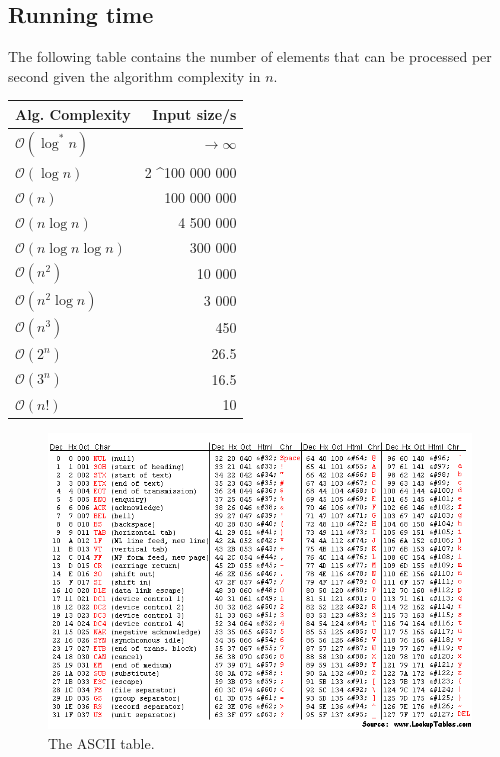 \documentclass[8pt,a4paper,landscape,oneside]{amsart}
\newcommand{\bigO}{\mathcal{O}}
\begin{document}
\begin{multicols*}{3}
        
\section{Running time}
The following table contains the number of elements that can be processed per second given the algorithm complexity in $n$.
\begin{center}
\begin{tabular}{lr}
Alg. Complexity & Input size/s \\ \hline
$\bigO(\log^*{n})$   & $\rightarrow \infty$ \\
$\bigO(\log{n})$     & 2 \textasciicircum 100 000 000 \\
$\bigO(n)$           & 100 000 000 \\
$\bigO(n\log{n})$   & 4 500 000 \\
$\bigO(n\log{n}\log{n})$ & 300 000 \\
$\bigO(n^2)$         & 10 000 \\
$\bigO(n^2\log{n})$ & 3 000 \\
$\bigO(n^3)$         & 450 \\
$\bigO(2^n)$         & 26.5 \\
$\bigO(3^n)$         & 16.5 \\
$\bigO(n!)$          & 10
\end{tabular}
\end{center}

\end{multicols*}

\pagebreak

\begin{figure}[h]
\centering
 \includegraphics[scale=1]{ascii_table.png}
 \caption{The ASCII table.}
\end{figure}
\end{document}
